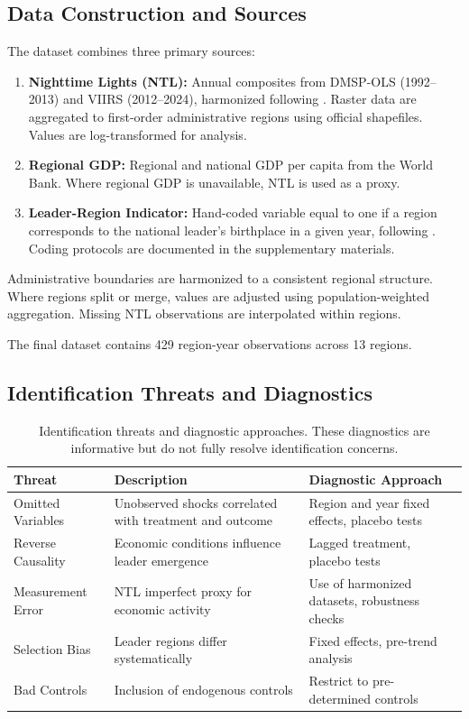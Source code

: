 \documentclass[12pt,a4paper]{article}
\begin{document}
\subsection{Data Construction and Sources}

The dataset combines three primary sources:

\begin{enumerate}
	\item \textbf{Nighttime Lights (NTL):} Annual composites from DMSP-OLS (1992–2013) and VIIRS (2012–2024), harmonized following \citet{Li2023, Elvidge2021}. Raster data are aggregated to first-order administrative regions using official shapefiles. Values are log-transformed for analysis.
	
	\item \textbf{Regional GDP:} Regional and national GDP per capita from the World Bank. Where regional GDP is unavailable, NTL is used as a proxy.
	
	\item \textbf{Leader-Region Indicator:} Hand-coded variable equal to one if a region corresponds to the national leader’s birthplace in a given year, following \citet{Hodler2014}. Coding protocols are documented in the supplementary materials.

	
\end{enumerate}

Administrative boundaries are harmonized to a consistent regional structure. Where regions split or merge, values are adjusted using population-weighted aggregation. Missing NTL observations are interpolated within regions.

The final dataset contains 429 region-year observations across 13 regions.

\subsection{Identification Threats and Diagnostics}

\begin{table}[ht]
	\centering
	\begin{tabular}{p{3.5cm} p{7.5cm} p{5.5cm}}
	\toprule
	\textbf{Threat} & \textbf{Description} & \textbf{Diagnostic Approach} \\
	\midrule
	Omitted Variables & Unobserved shocks correlated with treatment and outcome & Region and year fixed effects, placebo tests \\
	Reverse Causality & Economic conditions influence leader emergence & Lagged treatment, placebo tests \\
	Measurement Error & NTL imperfect proxy for economic activity & Use of harmonized datasets, robustness checks \\
	Selection Bias & Leader regions differ systematically & Fixed effects, pre-trend analysis \\
	Bad Controls & Inclusion of endogenous controls & Restrict to pre-determined controls \\
	\bottomrule
	\end{tabular}
	\caption{Identification threats and diagnostic approaches. These diagnostics are informative but do not fully resolve identification concerns.}
\end{table}
\end{document}
